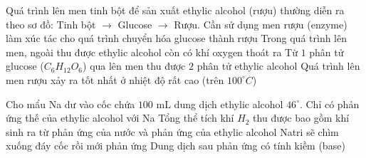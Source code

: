 \begin{ex}%
	Quá trình lên men tinh bột để sản xuất ethylic alcohol (rượu) thường diễn ra theo sơ đồ: Tinh bột $\longrightarrow$ Glucose $\longrightarrow$ Rượu.
	\choiceTF
	{\True Cần sử dụng men rượu (enzyme) làm xúc tác cho quá trình chuyển hóa glucose thành rượu}
	{Trong quá trình lên men, ngoài thu được ethylic alcohol còn có khí oxygen thoát ra}
	{\True Từ $1$ phân tử glucose ($C_6H_{12}O_6$) qua lên men thu được $2$ phân tử ethylic alcohol}
	{Quá trình lên men rượu xảy ra tốt nhất ở nhiệt độ rất cao (trên $100^\circ C$)}
\end{ex}

\begin{ex}%
	Cho mẩu Na dư vào cốc chứa $100$ mL dung dịch ethylic alcohol $46^\circ$.
	\choiceTF
	{Chỉ có phản ứng thế của ethylic alcohol với Na}
	{\True Tổng thể tích khí $H_2$ thu được bao gồm khí sinh ra từ phản ứng của nước và phản ứng của ethylic alcohol}
	{Natri sẽ chìm xuống đáy cốc rồi mới phản ứng}
	{\True Dung dịch sau phản ứng có tính kiềm (base)}
\end{ex}